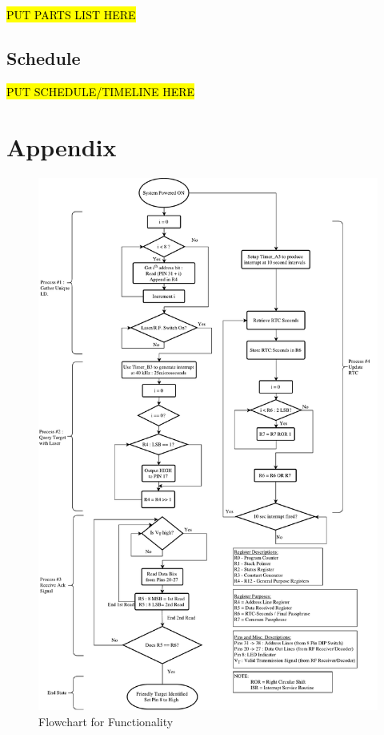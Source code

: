 \documentclass[letterpaper,10pt]{article}
\begin{document}
\begin{spacing}{1.15}
\hl{PUT PARTS LIST HERE}

\subsection{Schedule}
\hl{PUT SCHEDULE/TIMELINE HERE}


\clearpage


\section*{Appendix}

\begin{figure} [H]
	\centering
	\includegraphics[scale=0.450]{Friendly_Interrogator_Software_Flowchart.pdf}
	\caption{Flowchart for Functionality\label{fig:friendly-interrogator-software-flowchart}}
\end{figure}

\end{spacing}
\end{document}
